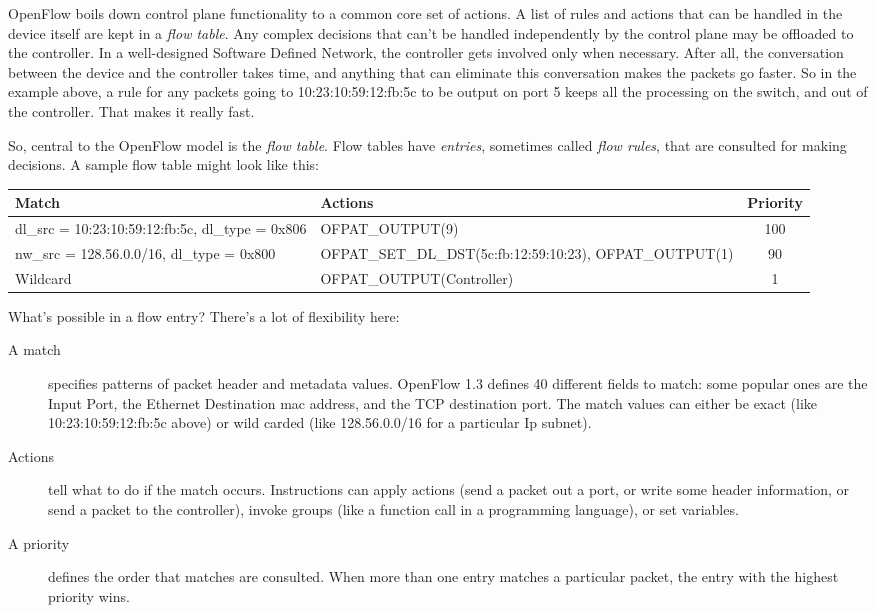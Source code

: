 OpenFlow boils down control plane functionality to a common core set of actions.
A list of rules and actions that can be handled in the device itself are kept in a \textit{flow table}.
Any complex decisions that can't be handled independently by the control plane may be offloaded to the controller.  
In a well-designed Software Defined Network, the controller gets involved only when necessary.
After all, the conversation between the device and the controller takes time, and anything that can 
eliminate this conversation makes the packets go faster.
So in the example above, a rule for any packets going to 10:23:10:59:12:fb:5c to be output on port 5 keeps all the processing on the switch, and out of the controller.  
That makes it really fast.  

So, central to the OpenFlow model is the \textit{flow table}.  
Flow tables have \textit{entries}, sometimes called \textit{flow rules}, that are consulted for making decisions.
A sample flow table might look like this:

\bigskip
\begin{tabularx}{6in}{|X|X|c|}
\hline\hline
Match & Actions & Priority
\\ \hline
dl\_src = 10:23:10:59:12:fb:5c, dl\_type = 0x806 & OFPAT\_OUTPUT(9) & 100 
\\ \hline
nw\_src = 128.56.0.0/16, dl\_type = 0x800 & OFPAT\_SET\_DL\_DST(5c:fb:12:59:10:23), OFPAT\_OUTPUT(1) & 90 
\\ \hline
Wildcard & OFPAT\_OUTPUT(Controller) & 1
\end{tabularx}

\bigskip

What's possible in a flow entry?
There's a lot of flexibility here:

\begin{description}
\item[A match] specifies patterns of packet header and metadata values.
OpenFlow 1.3 defines 40 different fields to match: some popular ones are the Input Port, 
the Ethernet Destination mac address, and the TCP destination port.
The match values can either be exact (like 10:23:10:59:12:fb:5c above) or wild carded (like 128.56.0.0/16 for a
particular Ip subnet).
\item[Actions] tell what to do if the match occurs.  
Instructions can apply actions (send a packet out a port, or write some header information, 
or send a packet to the controller), 
invoke groups (like a function call in a programming language), or set variables.
\item[A priority] defines the order that matches are consulted.  
When more than one entry matches a particular packet, the entry with the highest priority wins.
\end{description}

